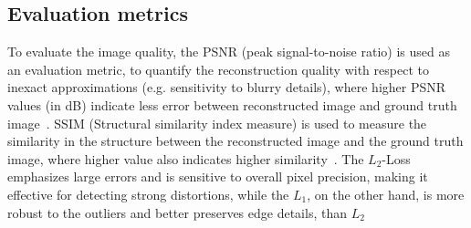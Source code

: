 \documentclass[12pt,a4paper]{article}
\begin{document}
\subsection{Evaluation metrics}

To evaluate the image quality, the PSNR (peak signal-to-noise ratio) is used as an evaluation metric, to quantify the reconstruction quality with respect to inexact approximations (e.g. sensitivity to blurry details), where higher PSNR values (in dB) indicate less error between reconstructed image and ground truth image~\cite{DeepFBP_CT}. SSIM (Structural similarity index measure) is used to measure the similarity in the structure between the reconstructed image and the ground truth image, where higher value also indicates higher similarity~\cite{DeepFBP_CT}. The $L_2$-Loss emphasizes large errors and is sensitive to overall pixel precision, making it effective for detecting strong distortions, while the $L_1$, on the other hand, is more robust to the outliers and better preserves edge details, than $L_2$
\end{document}
